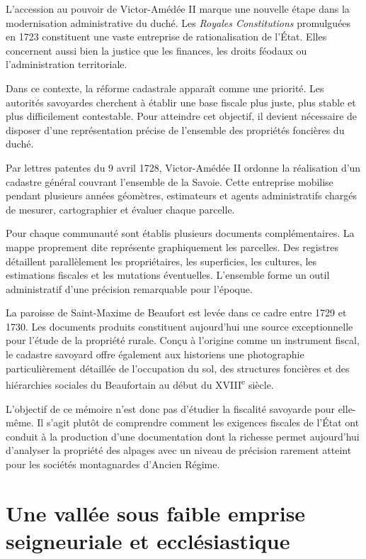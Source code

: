 \documentclass[12pt,a4paper]{report}
\begin{document}
L'accession au pouvoir de Victor-Amédée II marque une nouvelle étape dans la modernisation administrative du duché. Les \textit{Royales Constitutions} promulguées en 1723 constituent une vaste entreprise de rationalisation de l'État. Elles concernent aussi bien la justice que les finances, les droits féodaux ou l'administration territoriale.

Dans ce contexte, la réforme cadastrale apparaît comme une priorité. Les autorités savoyardes cherchent à établir une base fiscale plus juste, plus stable et plus difficilement contestable. Pour atteindre cet objectif, il devient nécessaire de disposer d'une représentation précise de l'ensemble des propriétés foncières du duché.

Par lettres patentes du 9 avril 1728, Victor-Amédée II ordonne la réalisation d'un cadastre général couvrant l'ensemble de la Savoie. Cette entreprise mobilise pendant plusieurs années géomètres, estimateurs et agents administratifs chargés de mesurer, cartographier et évaluer chaque parcelle.

Pour chaque communauté sont établis plusieurs documents complémentaires. La mappe proprement dite représente graphiquement les parcelles. Des registres détaillent parallèlement les propriétaires, les superficies, les cultures, les estimations fiscales et les mutations éventuelles. L'ensemble forme un outil administratif d'une précision remarquable pour l'époque.

La paroisse de Saint-Maxime de Beaufort est levée dans ce cadre entre 1729 et 1730. Les documents produits constituent aujourd'hui une source exceptionnelle pour l'étude de la propriété rurale. Conçu à l'origine comme un instrument fiscal, le cadastre savoyard offre également aux historiens une photographie particulièrement détaillée de l'occupation du sol, des structures foncières et des hiérarchies sociales du Beaufortain au début du XVIII\textsuperscript{e} siècle.

L'objectif de ce mémoire n'est donc pas d'étudier la fiscalité savoyarde pour elle-même. Il s'agit plutôt de comprendre comment les exigences fiscales de l'État ont conduit à la production d'une documentation dont la richesse permet aujourd'hui d'analyser la propriété des alpages avec un niveau de précision rarement atteint pour les sociétés montagnardes d'Ancien Régime.

\section{Une vallée sous faible emprise seigneuriale et ecclésiastique}
\end{document}
